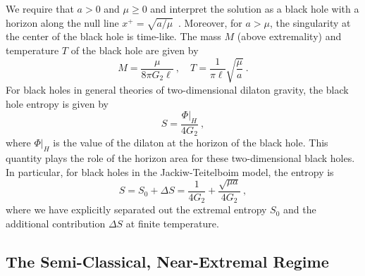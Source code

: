 \documentclass[12pt]{article}
\begin{document}
We require that $a > 0$ and $\mu \geq 0$ and interpret the solution as a black hole with a horizon along the null line $x^+ = \sqrt{a/\mu}$~\cite{Almheiri:2014cka}.  Moreover, for $a > \mu$, the singularity at the center of the black hole is time-like.  The mass $M$ (above extremality) and temperature $T$ of the black hole are given by
\begin{equation}
	M = \frac{\mu}{8 \pi G_2 \ell}~, \quad T = \frac{1}{\pi \ell}\sqrt{\frac{\mu}{a}}~.
\label{eq:bhmass}
\end{equation}
For black holes in general theories of two-dimensional dilaton gravity, the black hole entropy is given by~\cite{Grumiller:2007ju}
\begin{equation}
	S = \frac{\Phi|_H}{4 G_2}~,
\label{eq:bhlaw}
\end{equation}
where $\Phi|_H$ is the value of the dilaton at the horizon of the black hole.  This quantity plays the role of the horizon area for these two-dimensional black holes.  In particular, for black holes in the Jackiw-Teitelboim model, the entropy is
\begin{equation}
	S = S_0 + \Delta S = \frac{1}{4G_2} + \frac{\sqrt{\mu a}}{4G_2}~,
\end{equation}
where we have explicitly separated out the extremal entropy $S_0$ and the additional contribution $\Delta S$ at finite temperature.

\subsection{The Semi-Classical, Near-Extremal Regime}
\label{sec:jt:scales}
\end{document}
